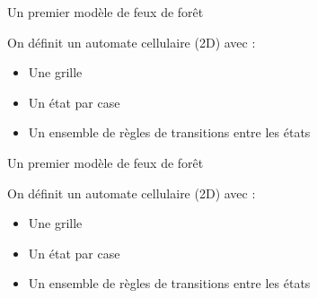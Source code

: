 \documentclass{beamer}
\begin{document}
\begin{frame}{Un premier modèle de feux de forêt \hyperlink{jump}{\beamerbutton{ }} \hypertarget{3}{\beamerbutton{ }}}
    \begin{definition}{On définit un automate cellulaire (2D) avec :}
        \begin{itemize}
            \item Une grille
            \item Un état par case
            \item Un ensemble de règles de transitions entre les états
        \end{itemize}
    \end{definition}

\end{frame}

\begin{frame}{Un premier modèle de feux de forêt \hyperlink{jump}{\beamerbutton{ }} \hypertarget{4}{\beamerbutton{ }}}
    \begin{definition}{On définit un automate cellulaire (2D) avec :}
        \begin{itemize}
            \item Une grille
            \item Un état par case
            \item Un ensemble de règles de transitions entre les états
        \end{itemize}
    \end{definition}

\end{frame}
\end{document}
